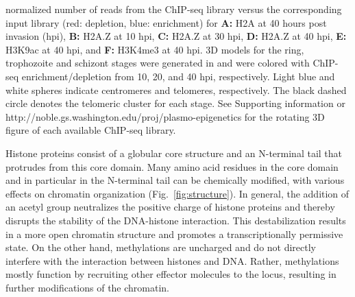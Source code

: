 \begin{FPfigure}
{normalized number of reads from the ChIP-seq library versus the corresponding
input library (red: depletion, blue: enrichment) for \textbf{A:} H2A at
40 hours post invasion (hpi), \textbf{B:} H2A.Z at 10 hpi, \textbf{C:} H2A.Z
at 30 hpi, \textbf{D:} H2A.Z
at 40 hpi, \textbf{E:} H3K9ac at 40 hpi, and \textbf{F:} H3K4me3 at 40 hpi. 3D
models for the ring, trophozoite and schizont stages were generated in
\citet{ay:three-dimensional} and were colored with ChIP-seq enrichment/depletion
from 10, 20, and 40 hpi, respectively. Light blue and white spheres indicate
centromeres and telomeres, respectively. The black dashed circle
denotes the telomeric cluster for each stage. See Supporting information or
http://noble.gs.washington.edu/proj/plasmo-epigenetics for the
rotating 3D figure of each available ChIP-seq library.}
\label{fig:structure}
\end{FPfigure}

Histone proteins consist of a globular core structure and an N-terminal tail
that protrudes from this core domain. Many amino acid residues in the core
domain and in particular in the N-terminal tail can be chemically modified,
with various effects on chromatin organization (Fig.~\ref{fig:structure}). In general, the
addition of an acetyl group neutralizes the positive charge of histone
proteins and thereby disrupts the stability of the DNA-histone interaction.
This destabilization results in a more open chromatin structure and promotes a
transcriptionally permissive state. On the other hand, methylations are
uncharged and do not directly interfere with the interaction between histones
and DNA. Rather, methylations mostly function by recruiting other effector
molecules to the locus, resulting in further modifications of the chromatin.

